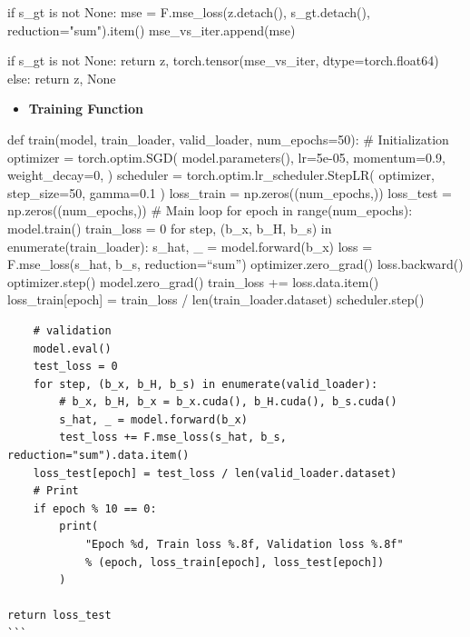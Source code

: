 \documentclass[
  letterpaper,
  DIV=11,
  numbers=noendperiod]{scrartcl}
\newenvironment{Shaded}{\begin{snugshade}}{\end{snugshade}}
\newcommand{\ControlFlowTok}[1]{\textcolor[rgb]{0.98,0.15,0.45}{#1}}
\newcommand{\KeywordTok}[1]{\textcolor[rgb]{0.98,0.15,0.45}{#1}}
\newcommand{\NormalTok}[1]{\textcolor[rgb]{0.97,0.97,0.95}{#1}}
\newcommand{\OperatorTok}[1]{\textcolor[rgb]{0.97,0.97,0.95}{#1}}
\newcommand{\StringTok}[1]{\textcolor[rgb]{0.90,0.86,0.45}{#1}}
\newcommand{\VariableTok}[1]{\textcolor[rgb]{0.97,0.97,0.95}{#1}}
\providecommand{\tightlist}{%
  \setlength{\itemsep}{0pt}\setlength{\parskip}{0pt}}
\begin{document}
\begin{Shaded}
\begin{Highlighting}[]
            \ControlFlowTok{if}\NormalTok{ s\_gt }\KeywordTok{is} \KeywordTok{not} \VariableTok{None}\NormalTok{:}
\NormalTok{                mse }\OperatorTok{=}\NormalTok{ F.mse\_loss(z.detach(), s\_gt.detach(), reduction}\OperatorTok{=}\StringTok{"sum"}\NormalTok{).item()}
\NormalTok{                mse\_vs\_iter.append(mse)}

        \ControlFlowTok{if}\NormalTok{ s\_gt }\KeywordTok{is} \KeywordTok{not} \VariableTok{None}\NormalTok{:}
            \ControlFlowTok{return}\NormalTok{ z, torch.tensor(mse\_vs\_iter, dtype}\OperatorTok{=}\NormalTok{torch.float64)}
        \ControlFlowTok{else}\NormalTok{:}
            \ControlFlowTok{return}\NormalTok{ z, }\VariableTok{None}
\end{Highlighting}
\end{Shaded}

\begin{itemize}
\tightlist
\item
  \textbf{Training Function}
\end{itemize}

def train(model, train\_loader, valid\_loader, num\_epochs=50): \#
Initialization optimizer = torch.optim.SGD( model.parameters(),
lr=5e-05, momentum=0.9, weight\_decay=0, ) scheduler =
torch.optim.lr\_scheduler.StepLR( optimizer, step\_size=50, gamma=0.1 )
loss\_train = np.zeros((num\_epochs,)) loss\_test =
np.zeros((num\_epochs,)) \# Main loop for epoch in range(num\_epochs):
model.train() train\_loss = 0 for step, (b\_x, b\_H, b\_s) in
enumerate(train\_loader): s\_hat, \_ = model.forward(b\_x) loss =
F.mse\_loss(s\_hat, b\_s, reduction=``sum'') optimizer.zero\_grad()
loss.backward() optimizer.step() model.zero\_grad() train\_loss +=
loss.data.item() loss\_train{[}epoch{]} = train\_loss /
len(train\_loader.dataset) scheduler.step()

\begin{verbatim}
    # validation
    model.eval()
    test_loss = 0
    for step, (b_x, b_H, b_s) in enumerate(valid_loader):
        # b_x, b_H, b_x = b_x.cuda(), b_H.cuda(), b_s.cuda()
        s_hat, _ = model.forward(b_x)
        test_loss += F.mse_loss(s_hat, b_s, reduction="sum").data.item()
    loss_test[epoch] = test_loss / len(valid_loader.dataset)
    # Print
    if epoch % 10 == 0:
        print(
            "Epoch %d, Train loss %.8f, Validation loss %.8f"
            % (epoch, loss_train[epoch], loss_test[epoch])
        )

return loss_test
```
\end{verbatim}
\end{document}
